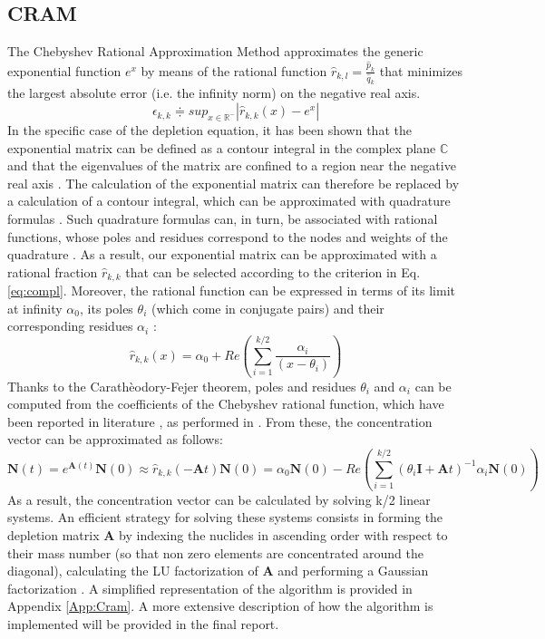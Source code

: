 \documentclass[a4paper,titlepage]{article}
\begin{document}
\subsection{CRAM}
The Chebyshev Rational Approximation Method approximates the generic exponential function $e^{x}$ by means of the rational function $\hat{r}_{k,l}=\frac{\hat{p}_{k}}{\hat{q}_{k}}$ that minimizes the largest absolute error (i.e. the infinity norm) on the negative real axis.
\begin{equation}
    \epsilon_{k,k}\doteqdot sup_{x\in\mathbb{R}^{-}}\left| \hat{r}_{k,k}(x) -e^{x}\right|
    \label{eq:compl}
\end{equation}
In the specific case of the depletion equation, it has been shown that the exponential matrix can be defined as a contour integral in the complex plane $\mathbb{C}$ and that the eigenvalues of the matrix are confined to a region near the negative real axis \cite{pusa2013numerical} . The calculation of the exponential matrix can therefore be replaced by a calculation of a contour integral, which can be approximated with quadrature formulas \cite{pusa2011rational}. Such quadrature formulas can, in turn, be associated with rational functions, whose poles and residues correspond to the nodes and weights of the quadrature \cite{trefethen2006talbot}.
As a result, our exponential matrix can be approximated with a rational fraction $\hat{r}_{k,k}$ that can be selected according to the criterion in Eq. \ref{eq:compl}.
Moreover, the rational function can be expressed in terms of its limit at infinity $\alpha_0$, its poles $\theta_i$ (which come in conjugate pairs) and their corresponding residues $\alpha_i$ \cite{pusa2010computing}:
\begin{equation}
   \hat{r}_{k,k}(x)=\alpha_0+Re\left(\sum_{i=1}^{k/2} \frac{\alpha_i}{(x-\theta_i)}\right)
\end{equation}
 Thanks to the Carathèodory-Fejer theorem, poles and residues $\theta_i$ and $\alpha_i$ can be computed from the coefficients of the Chebyshev rational function, which have been reported in literature \cite{carpenter1984extended}, as performed in \cite{trefethen2006talbot}. From these, the concentration vector can be approximated as follows:
\begin{equation}
    \textbf{N}(t)=e^{\textbf{A}(t)}\textbf{N}(0)\approx\hat{r}_{k,k}(-\textbf{A}t)\textbf{N}(0)=\alpha_0\textbf{N}(0)-Re\left(\sum_{i=1}^{k/2} (\theta_i\textbf{I}+\textbf{A}t)^{-1}\alpha_i\textbf{N}(0)\right)
\end{equation}
As a result, the concentration vector can be calculated by solving k/2 linear systems. An efficient strategy for solving these systems consists in forming the depletion matrix \textbf{A} by indexing the nuclides in ascending order with respect to their mass number (so that non zero elements are concentrated around the diagonal), calculating the LU factorization of \textbf{A} \cite{tarjan1976graph} and performing a Gaussian factorization \cite{rose1978algorithmic}.
A simplified representation of the algorithm is provided in Appendix \ref{App:Cram}.  A more extensive description of how the algorithm is implemented will be provided in the final report.
\end{document}
